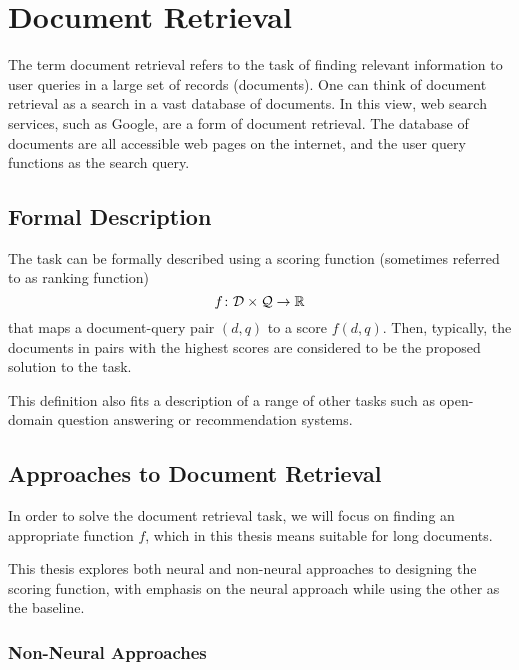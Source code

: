 \chapter{Document Retrieval}
\label{chap:docret}

The term document retrieval refers to the task of finding relevant information to user queries in a large set of records (documents). 
One can think of document retrieval as a search in a vast database of documents. 
In this view, web search services, such as Google, are a form of document retrieval. The database of documents are all accessible web pages on the internet, and the user query functions as the search query.

\section{Formal Description}
The task can be formally described \citep{two-tower} using a scoring function (sometimes referred to as ranking function) %
$$f\colon\mathcal{D}\times\mathcal{Q}\rightarrow\mathbb{R}$$
that maps a document-query pair $(d, q)$ to a score $f(d,q)$. 
Then, typically, the documents in pairs with the highest scores are considered to be the proposed solution to the task. 

This definition also fits a description of a range of other tasks such as open-domain question answering \citep{wiki-retrieval} or recommendation systems.

\section{Approaches to Document Retrieval}
In order to solve the document retrieval task, we will focus on finding an appropriate function $f$, which in this thesis means suitable for long documents.

This thesis explores both neural and non-neural approaches to designing the scoring function, with emphasis on the neural approach while using the other as the baseline.


\subsection{Non-Neural Approaches}

